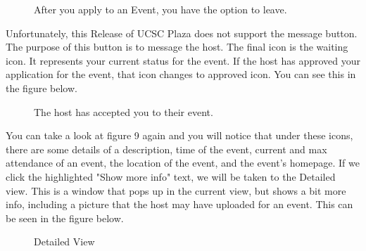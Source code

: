 \documentclass[10pt]{article}
\begin{document}
			\begin{figure}[H]
				\centering
				\caption{After you apply to an Event, you have the option to leave.}
				\label{fig:awesome_image}
			\end{figure}			 
			
			Unfortunately, this Release of UCSC Plaza does not support the message button. The purpose of this button is to message the host. The final icon is the waiting icon. It represents your current status for the event. If the host has approved your application for the event, that icon changes to approved icon. You can see this in the figure below.
			
			\begin{figure}[H]
				\centering
				\caption{The host has accepted you to their event.}
				\label{fig:awesome_image}
			\end{figure}
			
			You can take a look at figure 9 again and you will notice that under these icons, there are some details of a description, time of the event, current and max attendance of an event, the location of the event, and the event's homepage. If we click the highlighted "Show more info" text, we will be taken to the Detailed view. This is a window that pops up in the current view, but shows a bit more info, including a picture that the host may have uploaded for an event. This can be seen in the figure below.
			
			\begin{figure}[H]
				\centering
				\caption{Detailed View}
				\label{fig:awesome_image}
			\end{figure}	
			
\end{document}
